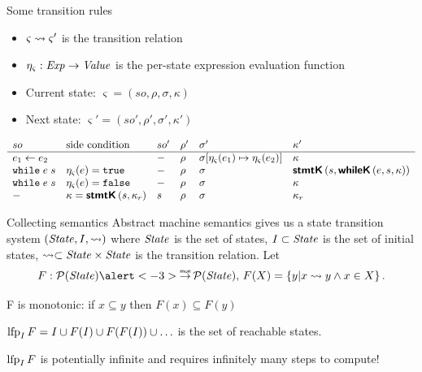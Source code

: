 \documentclass[aspectratio=169]{beamer}
\begin{document}
\begin{frame}{Some transition rules}
  \small
  \begin{itemize}
  \item $\varsigma \rightsquigarrow \varsigma'$ is the transition relation%
  \item \(\eta_\varsigma : \mathit{Exp} \to \mathit{Value} \) is the per-state expression evaluation function
\item Current state: \(\varsigma = (so, \rho, \sigma, \kappa) \)
\item Next state: \( \varsigma' = (so', \rho', \sigma', \kappa') \) \pause
  \end{itemize}
  \footnotesize
  \[
  \begin{array}{llllll}
    so & \text{side condition} & so' & \rho' & \sigma' & {\kappa}' \\ \hline
    e_1 \leftarrow e_2 & & - & \rho & \sigma[\eta_\varsigma(e_1) \mapsto \eta_\varsigma(e_2)] & {\kappa} \\
    \texttt{while}\; e\; s & \eta_\varsigma(e) = \texttt{true} & - & \rho & \sigma & \textsf{\textbf{stmtK}}\,(s, \textsf{\textbf{whileK}}\,(e, s,\kappa)) \\
    \texttt{while}\; e\; s & \eta_\varsigma(e) = \texttt{false} & - & \rho & \sigma & {\kappa} \\
    - & \kappa = \textsf{\textbf{stmtK}}\,(s,\kappa_r) & s & \rho & \sigma & {\kappa_r}
  \end{array}
  \]
\end{frame}

\begin{frame}{Collecting semantics}
  Abstract machine semantics gives us a state transition system $(\mathit{State}, I, \rightsquigarrow)$ where $\mathit{State}$ is the set of states, $I \subset \mathit{State}$ is the set of initial states, $\rightsquigarrow \subset \mathit{State} \times \mathit{State}$ is the transition relation. \pause Let
  \[ F : \pw(\State) \alert<-3>{\monarrow} \pw(\State),\, F(X) = \Set{y \vert x \step y \wedge x \in X}. \]\pause

  F is monotonic: if $x \subseteq y$ then $F(x) \subseteq F(y)$

  $\operatorname{lfp}_I F = I \cup F(I) \cup F(F(I)) \cup \ldots $ is the set of reachable states.\pause

  \alert{$\operatorname{lfp}_I F$ is potentially infinite and requires infinitely many steps to compute!}
\end{frame}
\end{document}
